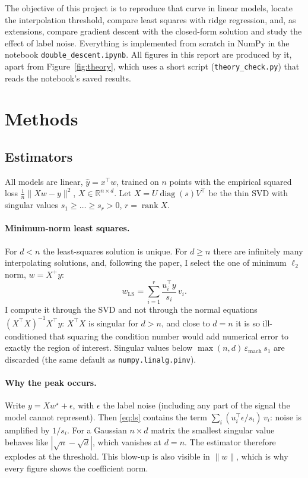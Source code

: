 \documentclass[10pt,a4paper]{article}
\newcommand{\R}{\mathbb{R}}
\newcommand{\norm}[1]{\lVert #1 \rVert}
\begin{document}
The objective of this project is to reproduce that curve in linear models, locate the interpolation threshold, compare least squares with ridge regression, and, as extensions, compare gradient descent with the closed-form solution and study the effect of label noise. Everything is implemented from scratch in NumPy in the notebook \texttt{double\_descent.ipynb}. All figures in this report are produced by it, apart from Figure~\ref{fig:theory}, which uses a short script (\texttt{theory\_check.py}) that reads the notebook's saved results.

\section{Methods}
\subsection{Estimators}
All models are linear, $\hat y = x^\top w$, trained on $n$ points with the empirical squared loss $\frac1n\norm{Xw-y}^2$, $X\in\R^{n\times d}$. Let $X = U\operatorname{diag}(s)V^\top$ be the thin SVD with singular values $s_1\ge\dots\ge s_r>0$, $r=\operatorname{rank}X$.

\paragraph{Minimum-norm least squares.} For $d<n$ the least-squares solution is unique. For $d\ge n$ there are infinitely many interpolating solutions, and, following the paper, I select the one of minimum $\ell_2$ norm, $w = X^+y$:
\begin{equation}\label{eq:ls}
  w_{\text{LS}} = \sum_{i=1}^{r} \frac{u_i^\top y}{s_i}\, v_i .
\end{equation}
I compute it through the SVD and not through the normal equations $(X^\top X)^{-1}X^\top y$: $X^\top X$ is singular for $d>n$, and close to $d=n$ it is so ill-conditioned that squaring the condition number would add numerical error to exactly the region of interest. Singular values below $\max(n,d)\,\varepsilon_{\text{mach}}\,s_1$ are discarded (the same default as \texttt{numpy.linalg.pinv}).

\paragraph{Why the peak occurs.} Write $y = X w^\star + \epsilon$, with $\epsilon$ the label noise (including any part of the signal the model cannot represent). Then \eqref{eq:ls} contains the term $\sum_i (u_i^\top\epsilon / s_i)\, v_i$: noise is amplified by $1/s_i$. For a Gaussian $n\times d$ matrix the smallest singular value behaves like $|\sqrt n-\sqrt d|$, which vanishes at $d=n$. The estimator therefore explodes at the threshold. This blow-up is also visible in $\norm{w}$, which is why every figure shows the coefficient norm.
\end{document}
